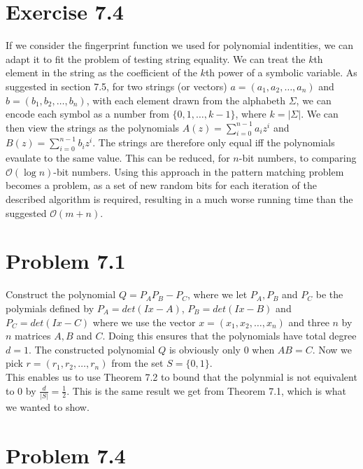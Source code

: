 \documentclass[a4paper, fleqn]{article}
\begin{document}
\section*{Exercise 7.4}
If we consider the fingerprint function we used for polynomial indentities, we can adapt it to fit the problem of testing string equality. We can treat the $k$th element in the string as the coefficient of the $k$th power of a symbolic variable. As suggested in section 7.5, for two strings (or vectors) $a=(a_1, a_2,\ldots,a_n)$ and $b=(b_1,b_2,\ldots,b_n)$, with each element drawn from the alphabeth $\Sigma$, we can encode each symbol as a number from $\{0,1,\ldots,k-1\}$, where
$k=|\Sigma|$. We can then view the strings as the polynomials $A(z)=\sum_{i=0}^{n-1}a_iz^i$ and $B(z)=\sum_{i=0}^{n-1}b_iz^i$. The strings are therefore only equal iff the polynomials evaulate to the same value. This can be reduced, for $n$-bit numbers, to comparing $\mathcal{O}(\log n)$-bit numbers. Using this approach in the pattern matching problem becomes a problem, as a set of new random bits for each iteration of the described algorithm is required, resulting in a much worse running
time than the suggested $\mathcal{O}(m+n)$.

\section*{Problem 7.1}
Construct the polynomial $Q=P_AP_B-P_C$, where we let $P_A, P_B$ and $P_C$ be the polymials defined by $P_A=det(Ix-A)$, $P_B=det(Ix-B)$ and $P_C=det(Ix-C)$ where we use the vector $x=(x_1,x_2,\ldots,x_n)$ and three $n$ by $n$ matrices $A,B$ and $C$. Doing this ensures that the polynomials have total degree $d=1$. The constructed polynomial $Q$ is obviously only $0$ when $AB=C$. Now we pick $r=(r_1,r_2,\ldots,r_n)$ from the set $S=\{0,1\}$. \\
This enables us to use Theorem 7.2 to bound that the polynmial is not equivalent to $0$ by $\frac{d}{|S|}=\frac{1}{2}$. This is the same result we get from Theorem 7.1, which is what we wanted to show.

\section*{Problem 7.4}
\end{document}
